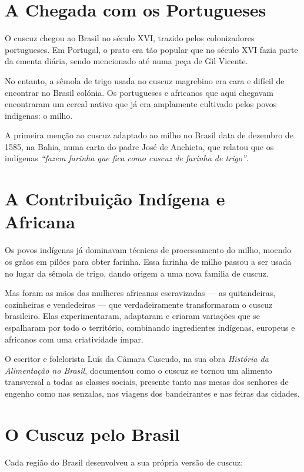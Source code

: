 \documentclass[12pt,a4paper,openright]{book}
\begin{document}
\section{A Chegada com os Portugueses}

O cuscuz chegou ao Brasil no século XVI, trazido pelos colonizadores portugueses. Em Portugal, o prato era tão popular que no século XVI fazia parte da ementa diária, sendo mencionado até numa peça de Gil Vicente.

No entanto, a sêmola de trigo usada no cuscuz magrebino era cara e difícil de encontrar no Brasil colónia. Os portugueses e africanos que aqui chegavam encontraram um cereal nativo que já era amplamente cultivado pelos povos indígenas: o milho.

A primeira menção ao cuscuz adaptado ao milho no Brasil data de dezembro de 1585, na Bahia, numa carta do padre José de Anchieta, que relatou que os indígenas \textit{“fazem farinha que fica como cuscuz de farinha de trigo”}.

\section{A Contribuição Indígena e Africana}

Os povos indígenas já dominavam técnicas de processamento do milho, moendo os grãos em pilões para obter farinha. Essa farinha de milho passou a ser usada no lugar da sêmola de trigo, dando origem a uma nova família de cuscuz.

Mas foram as mãos das mulheres africanas escravizadas --- as quitandeiras, cozinheiras e vendedeiras --- que verdadeiramente transformaram o cuscuz brasileiro. Elas experimentaram, adaptaram e criaram variações que se espalharam por todo o território, combinando ingredientes indígenas, europeus e africanos com uma criatividade ímpar.

O escritor e folclorista Luís da Câmara Cascudo, na sua obra \textit{História da Alimentação no Brasil}, documentou como o cuscuz se tornou um alimento transversal a todas as classes sociais, presente tanto nas mesas dos senhores de engenho como nas senzalas, nas viagens dos bandeirantes e nas feiras das cidades.

\section{O Cuscuz pelo Brasil}

Cada região do Brasil desenvolveu a sua própria versão de cuscuz:
\end{document}

